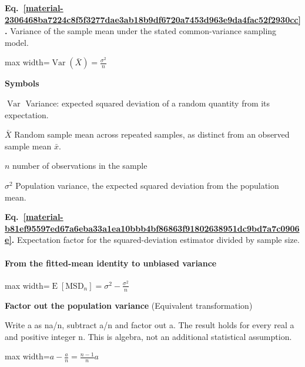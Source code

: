 \documentclass[11pt,a4paper]{article}
\begin{document}
\par\medskip
\begin{samepage}
\label{material-2306468ba7224c8f5f3277dae3ab18b9df6720a7453d963e9da4fac52f2930cc}
\noindent\textbf{Eq.~\ref*{material-2306468ba7224c8f5f3277dae3ab18b9df6720a7453d963e9da4fac52f2930cc}.} Variance of the sample mean under the stated common-variance sampling model.\par\nopagebreak
\begin{center}\begin{adjustbox}{max width=\linewidth}$\displaystyle \boxed{\operatorname{Var}(\bar X)=\frac{\sigma^2}{n}}$\end{adjustbox}\end{center}

\par\noindent\textbf{Symbols}

\par\noindent\textbf{\(\operatorname{Var}\)} Variance: expected squared deviation of a random quantity from its expectation.

\par\noindent\textbf{\(\bar X\)} Random sample mean across repeated samples, as distinct from an observed sample mean \ensuremath{\bar{x}}.

\par\noindent\textbf{\(n\)} number of observations in the sample

\par\noindent\textbf{\(\sigma^2\)} Population variance, the expected squared deviation from the population mean.

\end{samepage}
\medskip

\par\medskip
{}
\label{material-b81ef95597ed67a6eba33a1ea10bbb4bf86863f91802638951dc9bd7a7c0906e}
\noindent\textbf{Eq.~\ref*{material-b81ef95597ed67a6eba33a1ea10bbb4bf86863f91802638951dc9bd7a7c0906e}.} Expectation factor for the squared-deviation estimator divided by sample size.\par\nopagebreak
\paragraph{From the fitted-mean identity to unbiased variance}
\begin{center}\begin{adjustbox}{max width=\linewidth}$\displaystyle \operatorname{E}[\mathrm{MSD}_n]=\sigma^2-\frac{\sigma^2}{n}$\end{adjustbox}\end{center}
\noindent\textbf{Factor out the population variance} (Equivalent transformation)\par
Write a as na/n, subtract a/n and factor out a. The result holds for every real a and positive integer n. This is algebra, not an additional statistical assumption.
\begin{center}\begin{adjustbox}{max width=\linewidth}$\displaystyle a-\frac an=\frac{n-1}{n}a$\end{adjustbox}\end{center}
\end{document}
